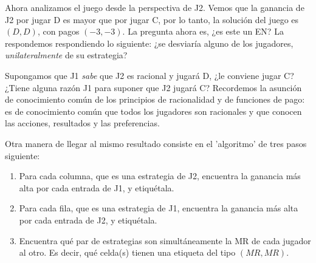 \documentclass[12pt]{scrartcl}
\theoremstyle{definition}
\newenvironment{myenum}
{ \begin{enumerate}
		\setlength{\itemsep}{0pt}
		\setlength{\parskip}{0pt}
		\setlength{\parsep}{0pt}     }
	{ \end{enumerate}                  }
\begin{document}
Ahora analizamos el juego desde la perspectiva de J2. Vemos que la ganancia de J2 por jugar D es mayor que por jugar C, por lo tanto, la solución del juego es $(D, D)$, con pagos $(-3, -3)$. La pregunta ahora es, ¿es este un EN? La respondemos respondiendo lo siguiente: ¿se desviaría alguno de los jugadores, \textit{unilateralmente} de su estrategia?

Supongamos que J1 \textit{sabe} que J2 es racional y jugará D, ¿le conviene jugar C? ¿Tiene alguna razón J1 para suponer que J2 jugará C? Recordemos la asunción de conocimiento común de los principios de racionalidad y de funciones de pago: es de conocimiento común que todos los jugadores son racionales y que conocen las acciones, resultados y las preferencias.

Otra manera de llegar al mismo resultado consiste en el 'algoritmo' de tres pasos siguiente:

\begin{myenum}
    \item Para cada columna, que es una estrategia de J2, encuentra la ganancia más alta por cada entrada de J1, y etiquétala.
    \item Para cada fila, que es una estrategia de J1, encuentra la ganancia más alta por cada entrada de J2, y etiquétala. 
    \item Encuentra qué par de estrategias son simultáneamente la MR de cada jugador al otro. Es decir, qué celda(s) tienen una etiqueta del tipo $(MR, MR)$.
\end{myenum}
\end{document}
